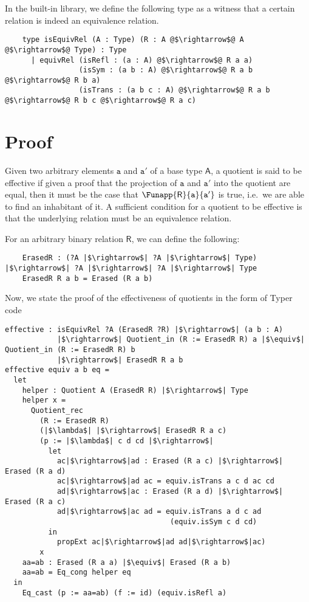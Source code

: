 \documentclass[12pt,twoside,maitrise]{dms}
\theoremstyle{definition}
\numberwithin{equation}{section}
\numberwithin{table}{chapter}
\numberwithin{figure}{chapter}
\newcommand\kw[1] {\textsf{#1}}
\newcommand\id[1] {\texttt{#1}}
\begin{document}
In the built-in library, we define the following type as a witness that a
certain relation is indeed an equivalence relation.

\begin{verbatim}
    type isEquivRel (A : Type) (R : A @$\rightarrow$@ A @$\rightarrow$@ Type) : Type
      | equivRel (isRefl : (a : A) @$\rightarrow$@ R a a)
                 (isSym : (a b : A) @$\rightarrow$@ R a b @$\rightarrow$@ R b a)
                 (isTrans : (a b c : A) @$\rightarrow$@ R a b @$\rightarrow$@ R b c @$\rightarrow$@ R a c)
\end{verbatim}

\section{Proof}
Given two arbitrary elements $\id{a}$ and $\id{a}'$ of a base type $\kw{A}$, a
quotient is said to be effective if given a proof that the projection of $\id{a}$
and $\id{a}'$ into the quotient are equal, then it must be the case that
$\Funapp{\kw{R}}{\id{a}}{\id{a}'}$ is true, i.e.\ we are able to find an
inhabitant of it. A sufficient condition for a quotient to be effective is that
the underlying relation must be an equivalence relation.

For an arbitrary binary relation $\kw{R}$, we can define the following:

\begin{verbatim}
    ErasedR : (?A |$\rightarrow$| ?A |$\rightarrow$| Type) |$\rightarrow$| ?A |$\rightarrow$| ?A |$\rightarrow$| Type
    ErasedR R a b = Erased (R a b)
\end{verbatim}

Now, we state the proof of the effectiveness of quotients in the form of Typer code

\begin{verbatim}
effective : isEquivRel ?A (ErasedR ?R) |$\rightarrow$| (a b : A)
            |$\rightarrow$| Quotient_in (R := ErasedR R) a |$\equiv$| Quotient_in (R := ErasedR R) b
            |$\rightarrow$| ErasedR R a b
effective equiv a b eq =
  let
    helper : Quotient A (ErasedR R) |$\rightarrow$| Type
    helper x =
      Quotient_rec
        (R := ErasedR R)
        (|$\lambda$| |$\rightarrow$| ErasedR R a c)
        (p := |$\lambda$| c d cd |$\rightarrow$|
          let
            ac|$\rightarrow$|ad : Erased (R a c) |$\rightarrow$| Erased (R a d)
            ac|$\rightarrow$|ad ac = equiv.isTrans a c d ac cd
            ad|$\rightarrow$|ac : Erased (R a d) |$\rightarrow$| Erased (R a c)
            ad|$\rightarrow$|ac ad = equiv.isTrans a d c ad
                                      (equiv.isSym c d cd)
          in
            propExt ac|$\rightarrow$|ad ad|$\rightarrow$|ac)
        x
    aa=ab : Erased (R a a) |$\equiv$| Erased (R a b)
    aa=ab = Eq_cong helper eq
  in
    Eq_cast (p := aa=ab) (f := id) (equiv.isRefl a)
\end{verbatim}
\end{document}
